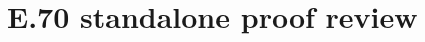 \documentclass[11pt,a4paper]{article}
\begin{document}
\section*{E.70 standalone proof review}



\end{document}
